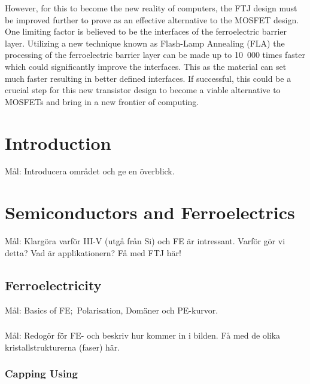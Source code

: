 \documentclass[11pt,twoside]{eitExjobb}
\begin{document}
However, for this to become the new reality of computers, the FTJ design must be
improved further to prove as an effective alternative to the MOSFET design. One
limiting factor is believed to be the interfaces of the ferroelectric barrier
layer. Utilizing a new technique known as Flash-Lamp Annealing (FLA) the
processing of the ferroelectric barrier layer can be made up to 10 000 times
faster which could significantly improve the interfaces. This as the material
can set much faster resulting in better defined interfaces. If successful, this
could be a crucial step for this new transistor design to become a viable
alternative to MOSFETs and bring in a new frontier of computing.

\tableofcontents
\listoffigures
\listoftables
\cleardoublepage{}
\mainmatter{}
\chapter{Introduction}\label{ch:intro}

Mål: Introducera området och ge en överblick.\cite{athle2019development}
    
\chapter{Semiconductors and Ferroelectrics}\label{ch:semiandferro}

Mål: Klargöra varför III-V (utgå från Si) och FE är intressant. Varför gör vi detta? Vad är applikationern? Få med FTJ här!

\section{Ferroelectricity}

Mål: Basics of FE;\  Polarisation, Domäner och PE-kurvor.

\subsection{}

Mål: Redogör för FE- och beskriv hur  kommer in i bilden. Få med
de olika kristallstrukturerna (faser) här.

\subsection{Capping Using }
\end{document}
